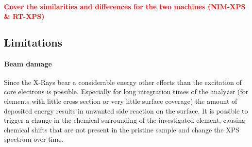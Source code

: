 \textcolor{red}{\textbf{Cover the similarities and differences for the two machines (NIM-XPS \& RT-XPS)}}

%	
%	
%	
%	
\subsection{Limitations}
\paragraph{Beam damage}
Since the X-Rays bear a considerable energy other effects than the excitation of core electrons is possible. Especially for long integration times of the analyzer (for elements with little cross section or very little surface coverage) the amount of deposited energy results in unwanted side reaction on the surface. It is possible to trigger a change in the chemical surrounding of the investigated element, causing chemical shifts that are not present in the pristine sample and change the XPS spectrum over time.

